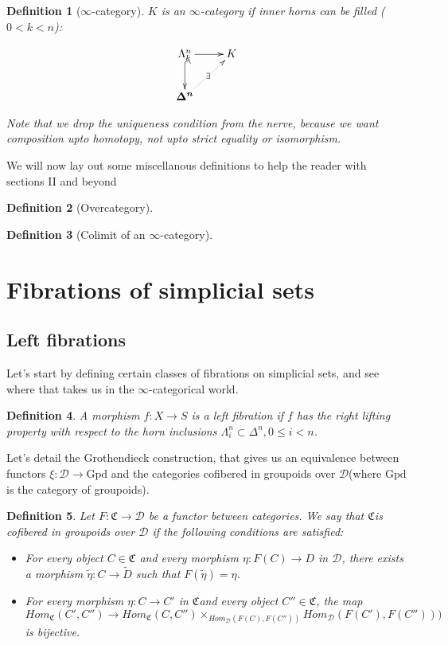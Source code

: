 \documentclass[12pt]{amsart}
\newcommand{\8}{\ensuremath{\infty}}
\newcommand{\C}{\ensuremath{\mathfrak{C}}}
\newcommand{\D}{\ensuremath{\mathscr{D}}}
\newcommand{\Horn}[2]{\ensuremath{\Lambda^{#1}_{#2}}}
\newcommand{\Simplex}[1][n]{\ensuremath{\boldsymbol{\Delta^{#1}}}}
\newcommand{\Gpd}{\ensuremath{\text{Gpd}}}
\newtheorem{definition}{Definition}
\begin{document}
\begin{definition}[\8-category]
  $K$ is an \8-category if inner horns can be filled ($0 < k < n$):

  $$
    \begin{xy}
      \xymatrix{
        \Horn{n}{k}\ar[r]\ar@{^{(}->}[d] & K \\
        \Simplex\ar@{.>}[ur]|\exists &
      }
    \end{xy}
  $$

  Note that we drop the uniqueness condition from the nerve, because we want composition upto homotopy, not upto strict equality or isomorphism.
\end{definition}

We will now lay out some miscellanous definitions to help the reader with sections II and beyond

\begin{definition}[Overcategory]
\end{definition}

\begin{definition}[Colimit of an \8-category]
\end{definition}

\section{Fibrations of simplicial sets}

\subsection{Left fibrations}
Let's start by defining certain classes of fibrations on simplicial sets, and see where that takes us in the \8-categorical world.

\begin{definition}
  A morphism $f: X \rightarrow S$ is a left fibration if $f$ has the right lifting property with respect to the horn inclusions $\Lambda_i^n\subset \Delta^n, 0\leq i < n$.
\end{definition}

Let's detail the Grothendieck construction, that gives us an equivalence between functors $\xi : \D \rightarrow \Gpd$ and the categories cofibered in groupoids over \D (where \Gpd is the category of groupoids).

\begin{definition}
  Let $F: \C \rightarrow \D$ be a functor between categories. We say that \C is cofibered in groupoids over \D
  if the following conditions are satisfied:
  \begin{itemize}
    \item For every object $C \in \C$ and every morphism $\eta: F(C) \rightarrow D$ in \D , there exists a morphism $\tilde{\eta} : C \rightarrow \tilde{D}$ such that $F(\tilde{\eta}) = \eta$.
    \item For every morphism $\eta: C \rightarrow C'$ in \C and every object $C'' \in \C$, the map
          $$
            Hom_\C(C', C'') \rightarrow Hom_\C(C, C'')\times_{Hom_\mathcal{D}(F(C), F(C''))}Hom_\mathcal{D}(F(C'), F(C'')))
          $$
          is bijective.
  \end{itemize}
\end{definition}
\end{document}
